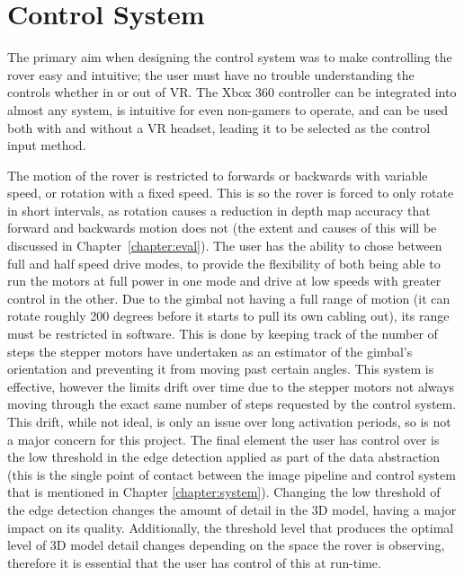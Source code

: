 \begin{table}[H]
\centering
\caption{Data Packet Format.}
\label{table:packet}
\end{table}

\section{Control System}

The primary aim when designing the control system was to make controlling the rover easy and intuitive; the user must have no trouble understanding the controls whether in or out of VR. The Xbox 360 controller can be integrated into almost any system, is intuitive for even non-gamers to operate, and can be used both with and without a VR headset, leading it to be selected as the control input method.

The motion of the rover is restricted to forwards or backwards with variable speed, or rotation with a fixed speed. This is so the rover is forced to only rotate in short intervals, as rotation causes a reduction in depth map accuracy that forward and backwards motion does not (the extent and causes of this will be discussed in Chapter~\ref{chapter:eval}). The user has the ability to chose between full and half speed drive modes, to provide the flexibility of both being able to run the motors at full power in one mode and drive at low speeds with greater control in the other. Due to the gimbal not having a full range of motion (it can rotate roughly 200 degrees before it starts to pull its own cabling out), its range must be restricted in software. This is done by keeping track of the number of steps the stepper motors have undertaken as an estimator of the gimbal's orientation and preventing it from moving past certain angles. This system is effective, however the limits drift over time due to the stepper motors not always moving through the exact same number of steps requested by the control system. This drift, while not ideal, is only an issue over long activation periods, so is not a major concern for this project. The final element the user has control over is the low threshold in the edge detection applied as part of the data abstraction (this is the single point of contact between the image pipeline and control system that is mentioned in Chapter \ref{chapter:system}). Changing the low threshold of the edge detection changes the amount of detail in the 3D model, having a major impact on its quality. Additionally, the threshold level that produces the optimal level of 3D model detail changes depending on the space the rover is observing, therefore it is essential that the user has control of this at run-time.

